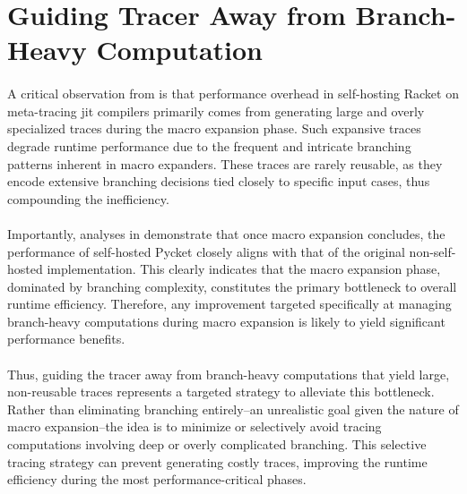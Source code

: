 	\section[\texorpdfstring{Guiding Tracer Away from Branch-Heavy Computation}{Hot Branches}]{Guiding Tracer Away from Branch-Heavy Computation}
    \label{section:hot-branches}

    \paragraph{}%
      A critical observation from  is that performance overhead in self-hosting Racket on meta-tracing \gls{jit} compilers primarily comes from generating large and overly specialized traces during the macro expansion phase. Such expansive traces degrade runtime performance due to the frequent and intricate branching patterns inherent in macro expanders. These traces are rarely reusable, as they encode extensive branching decisions tied closely to specific input cases, thus compounding the inefficiency.

    \paragraph{}%
      Importantly, analyses in  demonstrate that once macro expansion concludes, the performance of self-hosted Pycket closely aligns with that of the original non-self-hosted implementation. This clearly indicates that the macro expansion phase, dominated by branching complexity, constitutes the primary bottleneck to overall runtime efficiency. Therefore, any improvement targeted specifically at managing branch-heavy computations during macro expansion is likely to yield significant performance benefits.

    \paragraph{}%
      Thus, guiding the tracer away from branch-heavy computations that yield large, non-reusable traces represents a targeted strategy to alleviate this bottleneck. Rather than eliminating branching entirely--an unrealistic goal given the nature of macro expansion--the idea is to minimize or selectively avoid tracing computations involving deep or overly complicated branching. This selective tracing strategy can prevent generating costly traces, improving the runtime efficiency during the most performance-critical phases.

